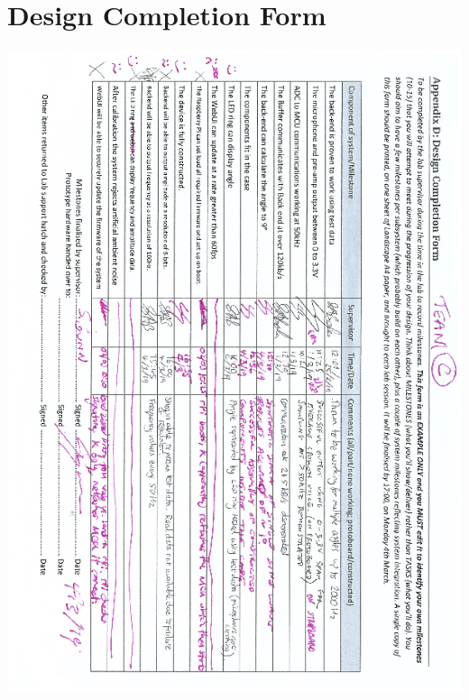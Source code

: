 \documentclass[a4paper]{article}
\begin{document}
\appendix
\section{Design Completion Form}
\includegraphics[width=500pt]{appendixA/DesignCompletionForm-complete.png}
\end{document}

